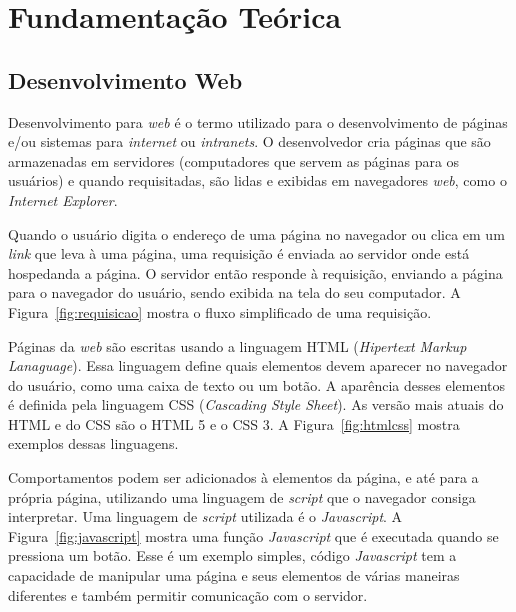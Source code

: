 \chapter{Fundamentação Teórica}

\section{Desenvolvimento Web}

Desenvolvimento para \textit{web} é o termo utilizado para o desenvolvimento de páginas e/ou sistemas para \textit{internet} ou \textit{intranets}. 
O desenvolvedor cria páginas que são armazenadas em servidores (computadores que servem as páginas para os usuários) e quando requisitadas, são lidas e exibidas em navegadores \textit{web}, como o \textit{Internet Explorer}.

Quando o usuário digita o endereço de uma página no navegador ou clica em um \textit{link} que leva à uma página, uma requisição é enviada ao servidor onde está hospedanda a página. 
O servidor então responde à requisição, enviando a página para o navegador do usuário, sendo exibida na tela do seu computador. A Figura~\ref{fig:requisicao} mostra o fluxo simplificado de uma requisição. 


Páginas da \textit{web} são escritas usando a linguagem HTML (\textit{Hipertext Markup Lanaguage}). 
Essa linguagem define quais elementos devem aparecer no navegador do usuário, como uma caixa de texto ou um botão. 
A aparência desses elementos é definida pela linguagem CSS (\textit{Cascading Style Sheet}).
As versão mais atuais do HTML e do CSS são o HTML 5 e o CSS 3. A Figura~\ref{fig:htmlcss} mostra exemplos dessas linguagens.


Comportamentos podem ser adicionados à elementos da página, e até para a própria página, utilizando uma linguagem de \textit{script} que o navegador consiga interpretar.
Uma linguagem de \textit{script} utilizada é o \textit{Javascript}. A Figura~\ref{fig:javascript} mostra uma função \textit{Javascript} que é executada quando se pressiona um botão.
Esse é um exemplo simples, código \textit{Javascript} tem a capacidade de manipular uma página e seus elementos de várias maneiras diferentes e também permitir comunicação com o servidor.


